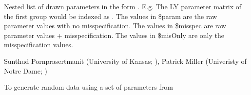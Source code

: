 \documentclass[a4paper]{book}
\begin{document}
%
\begin{Value}
Nested list of drawn parameters in the form . E.g. The LY parameter matrix of the first group would be indexed as .
The values in \$param are the raw parameter values with no misspecification. The values in \$misspec are raw parameter values + misspecification. The values in \$misOnly are only the misspecification values. 
\end{Value}
%
\begin{Author}\relax
	
Sunthud Pornprasertmanit (University of Kansas; ), Patrick Miller (Univeristy of Notre Dame; ) 
\end{Author}
%
\begin{SeeAlso}\relax
		
 To generate random data using a set of parameters from 

\end{SeeAlso}
%
\end{document}
